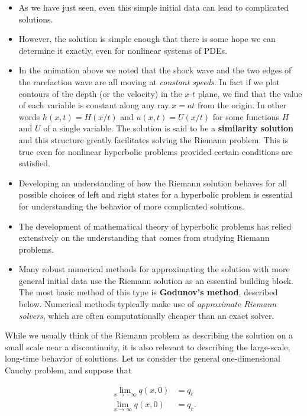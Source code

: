 \documentclass{SIAMbook2016}
\begin{document}
\begin{itemize}
\item
  As we have just seen, even this simple initial data can lead to
  complicated solutions.
\item
  However, the solution is simple enough that there is some hope we can
  determine it exactly, even for nonlinear systems of PDEs.
\item
  In the animation above we noted that the shock wave and the two edges
  of the rarefaction wave are all moving at \emph{constant speeds}. In
  fact if we plot contours of the depth (or the velocity) in the
  \(x\)-\(t\) plane, we find that the value of each variable is constant
  along any ray \(x = at\) from the origin. In other words
  \(h(x,t) = H(x/t)\) and \(u(x,t) = U(x/t)\) for some functions \(H\)
  and \(U\) of a single variable. The solution is said to be a
  \textbf{similarity solution} and this structure greatly facilitates
  solving the Riemann problem. This is true even for nonlinear
  hyperbolic problems provided certain conditions are satisfied.
\item
  Developing an understanding of how the Riemann solution behaves for
  all possible choices of left and right states for a hyperbolic problem
  is essential for understanding the behavior of more complicated
  solutions.
\item
  The development of mathematical theory of hyperbolic problems has
  relied extensively on the understanding that comes from studying
  Riemann problems.
\item
  Many robust numerical methods for approximating the solution with more
  general initial data use the Riemann solution as an essential building
  block. The most basic method of this type is \textbf{Godunov's
  method}, described below. Numerical methods typically make use of
  \emph{approximate Riemann solvers}, which are often computationally
  cheaper than an exact solver.
\end{itemize}

While we usually think of the Riemann problem as describing the solution
on a small scale near a discontinuity, it is also relevant to describing
the large-scale, long-time behavior of solutions. Let us consider the
general one-dimensional Cauchy problem, and suppose that

\begin{align*}
\lim_{x\to-\infty} q(x,0) & = q_\ell \\
\lim_{x\to\infty} q(x,0) & = q_r.
\end{align*}
\end{document}

